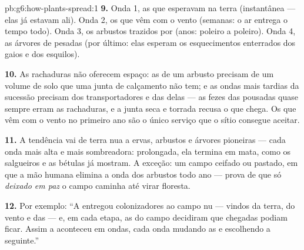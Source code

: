 \begin{solution}{pb:g6:how-plants-spread:1}
\textbf{9.} Onda 1, as  que esperavam na terra (instantânea
--- elas já estavam ali). Onda 2, os que vêm com o vento (semanas: o
ar entrega o tempo todo). Onda 3, os arbustos trazidos por 
(anos: poleiro a poleiro). Onda 4, as árvores de  pesadas
(por último: elas esperam os esquecimentos enterrados dos gaios e dos
esquilos).

\textbf{10.} As rachaduras não oferecem espaço: as  de um
arbusto precisam de um volume de solo que uma junta de calçamento não
tem; e as ondas mais tardias da sucessão precisam dos transportadores
e das  delas --- as fezes das  pousadas quase sempre erram
as rachaduras, e a junta seca e torrada recusa o que chega. Os que vêm
com o vento no primeiro ano são o único serviço que o sítio consegue
aceitar.

\textbf{11.} A tendência vai de terra nua a ervas, arbustos e árvores
pioneiras --- cada onda mais alta e mais sombreadora: prolongada, ela
termina em mata, como os salgueiros e as bétulas já mostram. A
exceção: um campo ceifado ou pastado, em que a mão humana elimina a
onda dos arbustos todo ano --- prova de que só \emph{deixado em paz} o
campo caminha até virar floresta.

\textbf{12.} Por exemplo: ``A  entregou colonizadores ao
campo nu --- vindos da terra, do vento e das  --- e, em cada
etapa, as  do campo decidiram que chegadas podiam ficar.
Assim a  aconteceu em ondas, cada onda mudando as
 e escolhendo a seguinte.''
\end{solution}
